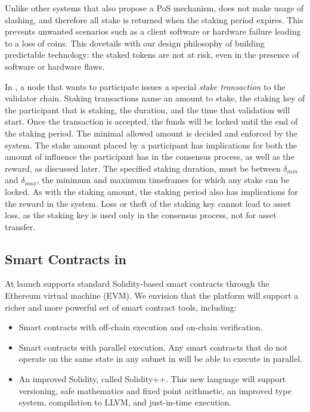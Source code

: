 \documentclass[runningheads]{llncs}
\begin{document}
Unlike other systems that also propose a PoS mechanism, \AVATokenName{} does not make usage of slashing, and therefore all stake is returned when the staking period expires. 
This prevents unwanted scenarios such as a client software or hardware failure leading to a loss of coins. 
This dovetails with our design philosophy of building predictable technology: the staked tokens are not at risk, even in the presence of software or hardware flaws.

In \AVAPlatformName{}, a node that wants to participate issues a special \emph{stake transaction} to the validator chain.
Staking transactions name an amount to stake, the staking key of the participant that is staking, the duration, and the time that validation will start. 
Once the transaction is accepted, the funds will be locked until the end of the staking period. The minimal allowed amount is decided and enforced by the system. 
The stake amount placed by a participant has implications for both the amount of influence the participant has in the consensus process, as well as the reward, as discussed later. 
The specified staking duration, must be between $\delta_{min}$ and $\delta_{max}$, the minimum and maximum timeframes for which any stake can be locked. 
As with the staking amount, the staking period also has implications for the reward in the system. 
Loss or theft of the staking key cannot lead to asset loss, as the staking key is used only in the consensus process, not for asset transfer.


\subsection{Smart Contracts in \AVATokenName}
At launch \AVAPlatformName{} supports standard Solidity-based smart contracts through the Ethereum virtual machine (EVM). We envision that the platform will support a richer and more powerful set of smart contract tools, including:
\begin{itemize}
\item Smart contracts with off-chain execution and on-chain verification.
\item Smart contracts with parallel execution. Any smart contracts that do not operate on the same state in any subnet in \AVAPlatformName{} will be able to execute in parallel.
\item An improved Solidity, called Solidity++. This new language will support versioning, safe mathematics and fixed point arithmetic, an improved type system, compilation to LLVM, and just-in-time execution. 
\end{itemize}
\end{document}
